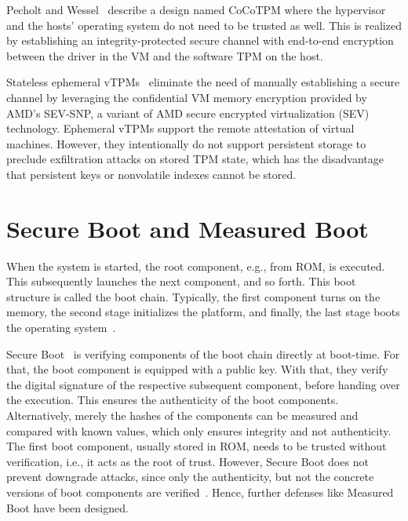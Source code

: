 Pecholt and Wessel~\cite{Pecholt2022} describe a design named CoCoTPM where the hypervisor and the hosts' operating system do not need to be trusted as well. This is realized by establishing an integrity-protected secure channel with end-to-end encryption between the driver in the VM and the software TPM on the host.

Stateless ephemeral vTPMs~\cite{Narayanan2023} eliminate the need of manually establishing a secure channel by leveraging the confidential VM memory encryption provided by AMD's SEV-SNP, a variant of AMD secure encrypted virtualization (SEV) technology.
Ephemeral vTPMs support the remote attestation of virtual machines.
However, they intentionally do not support persistent storage to preclude exfiltration attacks on stored TPM state, which has the disadvantage that persistent keys or nonvolatile indexes cannot be stored.


\section{Secure Boot and Measured Boot}

When the system is started, the root component, e.g., from ROM, is executed. This subsequently launches the next component, and so forth. This boot structure is called the boot chain. Typically, the first component turns on the memory, the second stage initializes the platform, and finally, the last stage boots the operating system~\cite{Yao2020}.

Secure Boot~\cite{Hendricks2004, UEFI, Frazelle2020} is verifying components of the boot chain directly at boot-time. For that, the boot component is equipped with a public key. With that, they verify the digital signature of the respective subsequent component, before handing over the execution. This ensures the authenticity of the boot components. Alternatively, merely the hashes of the components can be measured and compared with known values, which only ensures integrity and not authenticity. The first boot component, usually stored in ROM, needs to be trusted without verification, i.e., it acts as the root of trust. However, Secure Boot does not prevent downgrade attacks, since only the authenticity, but not the concrete versions of boot components are verified~\cite{272306}. Hence, further defenses like Measured Boot have been designed.


